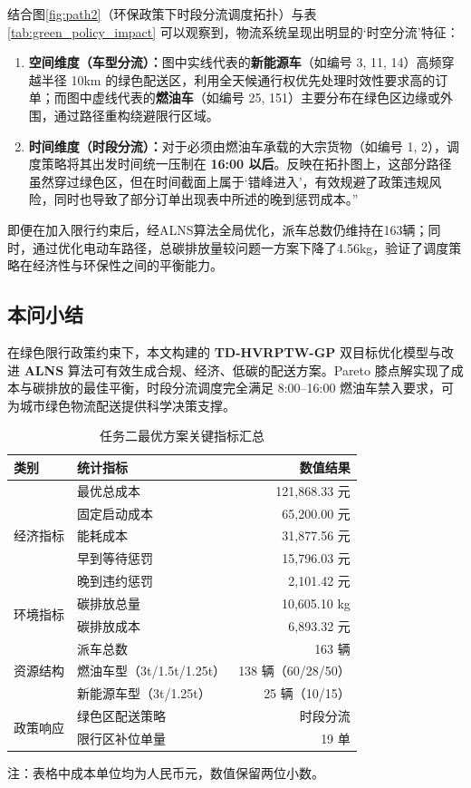 \documentclass[12pt,a4paper]{article}
\begin{document}
结合图\ref{fig:path2}（环保政策下时段分流调度拓扑）与表 \ref{tab:green_policy_impact} 可以观察到，物流系统呈现出明显的‘时空分流’特征：
\begin{enumerate}
    \item \textbf{空间维度（车型分流）：}图中实线代表的\textbf{新能源车}（如编号 3, 11, 14）高频穿越半径 10km 的绿色配送区，利用全天候通行权优先处理时效性要求高的订单；而图中虚线代表的\textbf{燃油车}（如编号 25, 151）主要分布在绿色区边缘或外围，通过路径重构绕避限行区域。
    \item \textbf{时间维度（时段分流）：}对于必须由燃油车承载的大宗货物（如编号 1, 2），调度策略将其出发时间统一压制在 \textbf{16:00 以后}。反映在拓扑图上，这部分路径虽然穿过绿色区，但在时间截面上属于‘错峰进入’，有效规避了政策违规风险，同时也导致了部分订单出现表中所述的晚到惩罚成本。”
\end{enumerate}
即便在加入限行约束后，经ALNS算法全局优化，派车总数仍维持在163辆；同时，通过优化电动车路径，总碳排放量较问题一方案下降了4.56kg，验证了调度策略在经济性与环保性之间的平衡能力。


\subsection{本问小结}
在绿色限行政策约束下，本文构建的 \textbf{TD-HVRPTW-GP} 双目标优化模型与改进 \textbf{ALNS} 算法可有效生成合规、经济、低碳的配送方案。Pareto 膝点解实现了成本与碳排放的最佳平衡，时段分流调度完全满足 8:00--16:00 燃油车禁入要求，可为城市绿色物流配送提供科学决策支撑。

\begin{table}[h]
  \centering
  \caption{任务二最优方案关键指标汇总}
  \setlength{\tabcolsep}{10pt}
  \begin{tabular}{@{}l l r@{}}
    \toprule
    类别 & 统计指标 & 数值结果 \\
    \midrule
    \multirow{5}{*}{经济指标}
    & 最优总成本 & 121,868.33 元 \\
    & 固定启动成本 & 65,200.00 元 \\
    & 能耗成本 & 31,877.56 元 \\
    & 早到等待惩罚 & 15,796.03 元 \\
    & 晚到违约惩罚 & 2,101.42 元 \\
    \midrule
    \multirow{2}{*}{环境指标}
    & 碳排放总量 & 10,605.10 kg \\
    & 碳排放成本 & 6,893.32 元 \\
    \midrule
    \multirow{3}{*}{资源结构}
    & 派车总数 & 163 辆 \\
    & 燃油车型（3t/1.5t/1.25t） & 138 辆（60/28/50） \\
    & 新能源车型（3t/1.25t） & 25 辆（10/15） \\
    \midrule
    \multirow{2}{*}{政策响应}
    & 绿色区配送策略 & 时段分流 \\
    & 限行区补位单量 & 19 单 \\
    \bottomrule
  \end{tabular}
  \vspace{0.5em}
  
  \footnotesize 注：表格中成本单位均为人民币元，数值保留两位小数。
\end{table}
\end{document}
